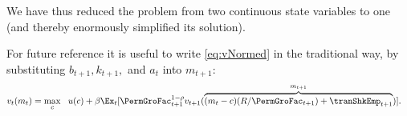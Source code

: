 We have thus reduced the problem from two continuous state variables to one (and thereby enormously simplified its solution).

For future reference it is useful to write \eqref{eq:vNormed} in the traditional way, by substituting $b_{t+1},k_{t+1},$ and $a_{t}$ into $m_{t+1}$:
\begin{equation}\begin{gathered}\begin{aligned}
      v_{t}(m_{t}) & = \max_{c} ~~ u(c)+ \beta \Ex_{t}[ \PermGroFac_{t+1}^{1-\rho}v_{t+1}(\overbrace{(m_{t}-c)(R/\PermGroFac_{t+1})+\tranShkEmp_{t+1}}^{m_{t+1}})] \label{eq:vusual}.
    \end{aligned}\end{gathered}\end{equation}

